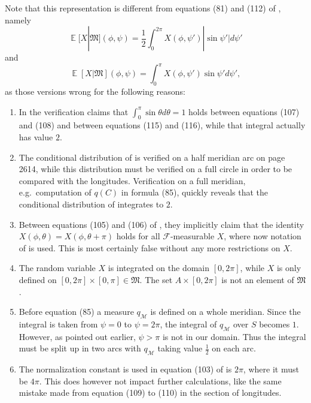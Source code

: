 \documentclass[twoside,a4paper]{report}
\theoremstyle{plain}
\theoremstyle{definition}
\theoremstyle{remark}
\numberwithin{equation}{chapter}
\DeclareMathOperator{\E}{\mathbb{E}}
\DeclareMathOperator{\1}{\mathbbm{1}}
\newcommand{\F}{\mathcal{F}}
\begin{document}
Note that this representation is different from equations (81) and (112) of \cite{Gyenis17}, namely
\begin{equation}
\E[X|\mathfrak{M}](\phi,\psi)=\frac{1}{2}\int_0^{2\pi}X(\phi,\psi')|\sin\psi'|d\psi'
\end{equation}
and 
\begin{equation}
\E[X|\mathfrak{M}](\phi,\psi)=\int_0^{\pi}X(\phi,\psi')\sin\psi'd\psi',
\end{equation}
as those versions wrong for the following reasons:
\begin{enumerate}
\item In the verification \cite{Gyenis17} claims that $\int_0^\pi\sin\theta d\theta=1$ holds between equations (107) and (108) and between equations (115) and (116), while that integral actually has value $2$.
\item The conditional distribution of \cite{Gyenis17} is verified on a half meridian arc on page 2614, while this distribution must be verified on a full circle in order to be compared with the longitudes. Verification on a full meridian, e.g.~computation of $q(C)$ in formula (85), quickly reveals that the conditional distribution of \cite{Gyenis17} integrates to $2$.
\item Between equations (105) and (106) of \cite{Gyenis17}, they implicitly claim that the identity $X(\phi,\theta)=X(\phi,\theta+\pi)$ holds for all $\F$-measurable $X$, where now notation of \cite{Gyenis17} is used. This is most certainly false without any more restrictions on $X$.
\item The random variable $X$ is integrated on the domain $[0,2\pi]$, while $X$ is only defined on $[0,2\pi]\times[0,\pi]\in\mathfrak{M}$. The set $A\times[0,2\pi]$ is not an element of $\mathfrak{M}$.
\item Before equation (85) a measure $q_\mathcal{M}$ is defined on a whole meridian. Since the integral is taken from $\psi=0$ to $\psi=2\pi$, the integral of $q_\mathcal{M}$ over $S$ becomes $1$. However, as pointed out earlier, $\psi>\pi$ is not in our domain. Thus the integral must be split up in two arcs with $q_{\mathcal{M}}$ taking value $\frac{1}{2}$ on each arc.
\item The normalization constant is used in equation (103) of \cite{Gyenis17} is $2\pi$, where it must be $4\pi$. This does however not impact further calculations, like the same mistake made from equation (109) to (110) in the section of longitudes.
\end{enumerate}
\end{document}
